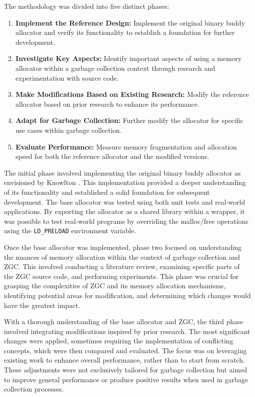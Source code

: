 The methodology was divided into five distinct phases:

\begin{enumerate}
    \item \textbf{Implement the Reference Design:} Implement the original binary buddy allocator and verify its functionality to establish a foundation for further development.
    \item \textbf{Investigate Key Aspects:} Identify important aspects of using a memory allocator within a garbage collection context through research and experimentation with source code.
    \item \textbf{Make Modifications Based on Existing Research:} Modify the reference allocator based on prior research to enhance its performance.
    \item \textbf{Adapt for Garbage Collection:} Further modify the allocator for specific use cases within garbage collection.
    \item \textbf{Evaluate Performance:} Measure memory fragmentation and allocation speed for both the reference allocator and the modified versions.
\end{enumerate}

The initial phase involved implementing the original binary buddy allocator as envisioned by Knowlton \cite{buddy}. This implementation provided a deeper understanding of its functionality and established a solid foundation for subsequent development. The base allocator was tested using both unit tests and real-world applications. By exporting the allocator as a shared library within a wrapper, it was possible to test real-world programs by overriding the malloc/free operations using the \texttt{LD\_PRELOAD} environment variable.

Once the base allocator was implemented, phase two focused on understanding the nuances of memory allocation within the context of garbage collection and ZGC. This involved conducting a literature review, examining specific parts of the ZGC source code, and performing experiments. This phase was crucial for grasping the complexities of ZGC and its memory allocation mechanisms, identifying potential areas for modification, and determining which changes would have the greatest impact.

With a thorough understanding of the base allocator and ZGC, the third phase involved integrating modifications inspired by prior research. The most significant changes were applied, sometimes requiring the implementation of conflicting concepts, which were then compared and evaluated. The focus was on leveraging existing work to enhance overall performance, rather than to start from scratch. These adjustments were not exclusively tailored for garbage collection but aimed to improve general performance or produce positive results when used in garbage collection processes.

